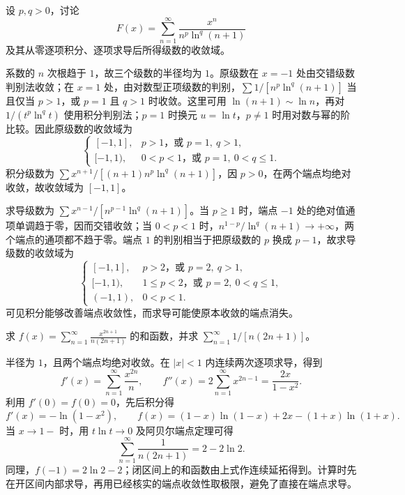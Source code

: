 \begin{example}
\label{ex:power-series-logarithmic-endpoint-changes}
设 $p,q>0$，讨论
\[
    F(x)=\sum_{n=1}^\infty\frac{x^n}{n^p\ln^q(n+1)}
\]
及其从零逐项积分、逐项求导后所得级数的收敛域。
\end{example}

\begin{solve}
系数的 $n$ 次根趋于 $1$，故三个级数的半径均为 $1$。原级数在 $x=-1$ 处由交错级数判别法收敛；在 $x=1$ 处，由对数型正项级数的判别，$\sum1/[n^p\ln^q(n+1)]$ 当且仅当 $p>1$，或 $p=1$ 且 $q>1$ 时收敛。这里可用 $\ln(n+1)\sim\ln n$，再对 $1/(t^p\ln^qt)$ 使用积分判别法；$p=1$ 时换元 $u=\ln t$，$p\neq1$ 时用对数与幂的阶比较。因此原级数的收敛域为
\[
    \begin{cases}
        [-1,1],&p>1\text{，或 }p=1,\ q>1,\\
        [-1,1),&0<p<1\text{，或 }p=1,\ 0<q\leq1.
    \end{cases}
\]
积分级数为 $\sum x^{n+1}/[(n+1)n^p\ln^q(n+1)]$，因 $p>0$，在两个端点均绝对收敛，故收敛域为 $[-1,1]$。

求导级数为 $\sum x^{n-1}/[n^{p-1}\ln^q(n+1)]$。当 $p\geq1$ 时，端点 $-1$ 处的绝对值通项单调趋于零，因而交错收敛；当 $0<p<1$ 时，$n^{1-p}/\ln^q(n+1)\to+\infty$，两个端点的通项都不趋于零。端点 $1$ 的判别相当于把原级数的 $p$ 换成 $p-1$，故求导级数的收敛域为
\[
    \begin{cases}
        [-1,1],&p>2\text{，或 }p=2,\ q>1,\\
        [-1,1),&1\leq p<2\text{，或 }p=2,\ 0<q\leq1,\\
        (-1,1),&0<p<1.
    \end{cases}
\]
可见积分能够改善端点收敛性，而求导可能使原本收敛的端点消失。
\end{solve}

\begin{example}
\label{ex:power-series-summation-by-two-derivatives}
求 $\displaystyle f(x)=\sum_{n=1}^\infty\frac{x^{2n+1}}{n(2n+1)}$ 的和函数，并求 $\displaystyle\sum_{n=1}^\infty1/[n(2n+1)]$。
\end{example}

\begin{solve}
半径为 $1$，且两个端点均绝对收敛。在 $|x|<1$ 内连续两次逐项求导，得到
\[
    f'(x)=\sum_{n=1}^\infty\frac{x^{2n}}n,
    \qquad f''(x)=2\sum_{n=1}^\infty x^{2n-1}
       =\frac{2x}{1-x^2}.
\]
利用 $f'(0)=f(0)=0$，先后积分得
\[
    f'(x)=-\ln(1-x^2),\qquad
    f(x)=(1-x)\ln(1-x)+2x-(1+x)\ln(1+x).
\]
当 $x\to1-$ 时，用 $t\ln t\to0$ 及阿贝尔端点定理可得
\[
    \sum_{n=1}^\infty\frac1{n(2n+1)}=2-2\ln2.
\]
同理，$f(-1)=2\ln2-2$；闭区间上的和函数由上式作连续延拓得到。计算时先在开区间内部求导，再用已经核实的端点收敛性取极限，避免了直接在端点求导。
\end{solve}

